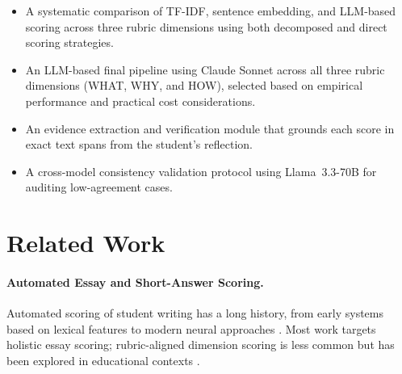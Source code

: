 \documentclass[11pt]{article}
\begin{document}
\begin{itemize}[leftmargin=1.5em]
    \item A systematic comparison of TF-IDF, sentence embedding, and LLM-based scoring across three rubric dimensions using both decomposed and direct scoring strategies.
    \item An LLM-based final pipeline using Claude Sonnet across all three rubric dimensions (WHAT, WHY, and HOW), selected based on empirical performance and practical cost considerations.
    \item An evidence extraction and verification module that grounds each score in exact text spans from the student's reflection.
    \item A cross-model consistency validation protocol using Llama~3.3-70B for auditing low-agreement cases.
\end{itemize}



\section{Related Work}

\paragraph{Automated Essay and Short-Answer Scoring.}
Automated scoring of student writing has a long history, from early systems based on lexical features \citep{page1966imminence} to modern neural approaches \citep{taghipour2016neural}. Most work targets holistic essay scoring; rubric-aligned dimension scoring is less common but has been explored in educational contexts \citep{mathias2020happy}.
\end{document}
